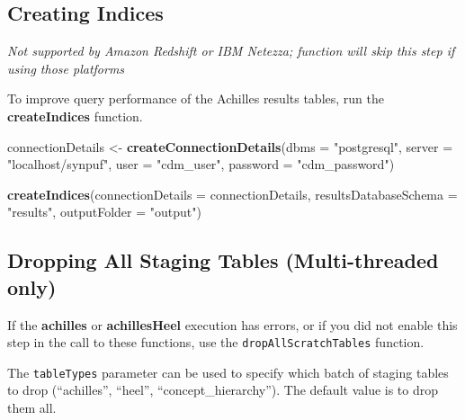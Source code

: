 \documentclass[]{article}
\newenvironment{Shaded}{\begin{snugshade}}{\end{snugshade}}
\newcommand{\KeywordTok}[1]{\textcolor[rgb]{0.13,0.29,0.53}{\textbf{#1}}}
\newcommand{\DataTypeTok}[1]{\textcolor[rgb]{0.13,0.29,0.53}{#1}}
\newcommand{\StringTok}[1]{\textcolor[rgb]{0.31,0.60,0.02}{#1}}
\newcommand{\NormalTok}[1]{#1}
\begin{document}
\subsection{Creating Indices}\label{creating-indices}

\emph{Not supported by Amazon Redshift or IBM Netezza; function will
skip this step if using those platforms}

To improve query performance of the Achilles results tables, run the
\textbf{createIndices} function.

\begin{Shaded}
\begin{Highlighting}[]
\NormalTok{connectionDetails <-}\StringTok{ }\KeywordTok{createConnectionDetails}\NormalTok{(}\DataTypeTok{dbms =} \StringTok{"postgresql"}\NormalTok{, }
                                             \DataTypeTok{server =} \StringTok{"localhost/synpuf"}\NormalTok{, }
                                             \DataTypeTok{user =} \StringTok{"cdm_user"}\NormalTok{, }
                                             \DataTypeTok{password =} \StringTok{"cdm_password"}\NormalTok{)}

\KeywordTok{createIndices}\NormalTok{(}\DataTypeTok{connectionDetails =}\NormalTok{ connectionDetails, }
              \DataTypeTok{resultsDatabaseSchema =} \StringTok{"results"}\NormalTok{, }
              \DataTypeTok{outputFolder =} \StringTok{"output"}\NormalTok{)}
\end{Highlighting}
\end{Shaded}

\subsection{Dropping All Staging Tables (Multi-threaded
only)}\label{dropping-all-staging-tables-multi-threaded-only}

If the \textbf{achilles} or \textbf{achillesHeel} execution has errors,
or if you did not enable this step in the call to these functions, use
the \texttt{dropAllScratchTables} function.

The \texttt{tableTypes} parameter can be used to specify which batch of
staging tables to drop (``achilles'', ``heel'', ``concept\_hierarchy'').
The default value is to drop them all.
\end{document}
